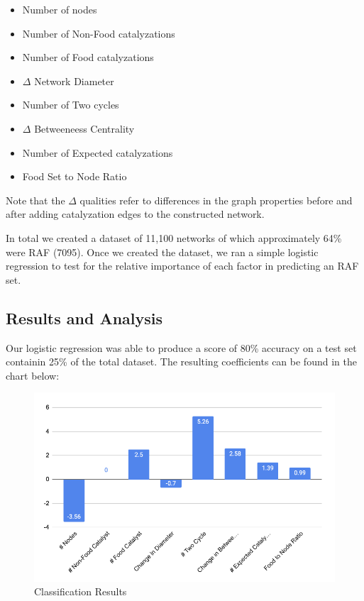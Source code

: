 \documentclass[11pt]{article}
\begin{document}
\begin{itemize}
        \item Number of nodes
        \item Number of Non-Food catalyzations
        \item Number of Food catalyzations
        \item $\Delta$ Network Diameter
        \item Number of Two cycles
        \item  $\Delta$ Betweeneess Centrality
        \item Number of Expected catalyzations
        \item Food Set to Node Ratio
\end{itemize}

Note that the $\Delta$ qualities refer to differences in the graph properties before and after adding catalyzation edges to the constructed network.


In total we created a dataset of 11,100 networks of which approximately 64\% were RAF (7095).
Once we created the dataset, we ran a simple logistic regression to test for the relative importance of each factor in predicting an RAF set.

\subsection*{Results and Analysis}

Our logistic regression was able to produce a score of 80\% accuracy on a test set containin 25\% of the total dataset. 
The resulting coefficients can be found in the chart below:

\begin{figure}[H]
    \centering
    \includegraphics[width=15cm]{classification}
    \caption{Classification Results}
\end{figure}
\end{document}
